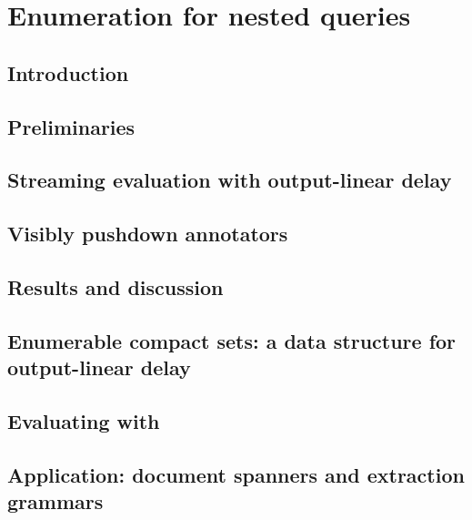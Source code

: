 \documentclass[pdftex]{pucthesis}	%
\begin{document}
\chapter[ENUMERATION FOR NESTED QUERIES]{Enumeration for nested queries} \label{ch1}

\section{Introduction}\label{nested:sec:intro}


\section{Preliminaries}\label{nested:sec:prelim}


\section{Streaming evaluation with output-linear delay}\label{nested:sec:enum}


\section{Visibly pushdown annotators}\label{nested:sec:vpann}


\section{Results and discussion}\label{nested:sec:results}


\section{Enumerable compact sets: a data structure for output-linear delay}\label{nested:sec:ds}


\section{Evaluating \vpannnames with \lindelay}\label{nested:sec:eval}


\section{Application: document spanners and extraction grammars}\label{nested:sec:spanners}

\end{document}
